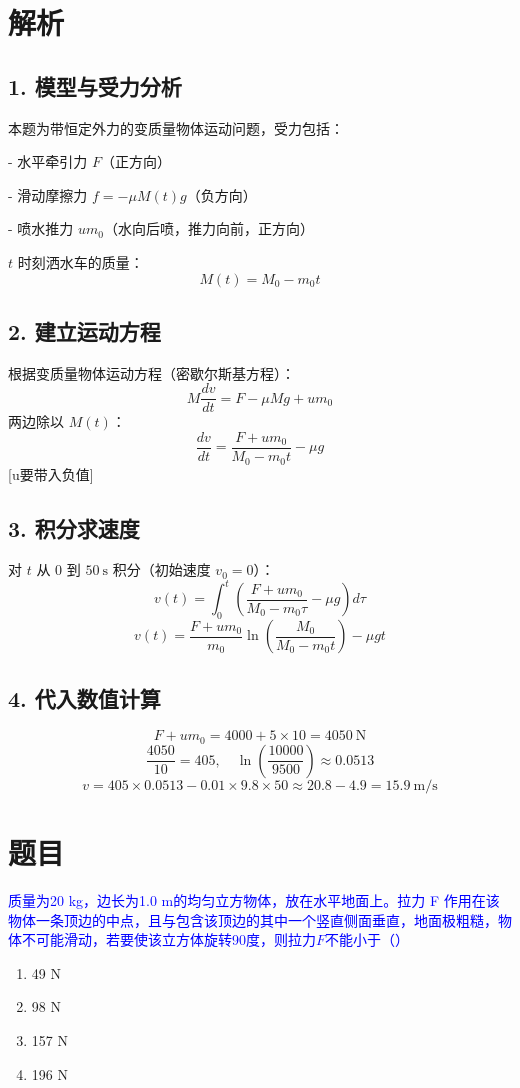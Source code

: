 \documentclass[11pt,a4paper]{article}
\begin{document}
\section*{解析}

\subsection*{1. 模型与受力分析}
本题为带恒定外力的变质量物体运动问题，受力包括：

- 水平牵引力 $F$（正方向）

- 滑动摩擦力 $f = -\mu M(t)g$（负方向）

- 喷水推力 $u m_0$（水向后喷，推力向前，正方向）

\noindent $t$ 时刻洒水车的质量：
\[
M(t) = M_0 - m_0 t
\]

\subsection*{2. 建立运动方程}
根据变质量物体运动方程（密歇尔斯基方程）：
\[
M \frac{dv}{dt} = F - \mu M g + u m_0
\]
两边除以 $M(t)$：
\[
\frac{dv}{dt} = \frac{F + u m_0}{M_0 - m_0 t} - \mu g
\]
[u要带入负值]
\subsection*{3. 积分求速度}
对 $t$ 从 $0$ 到 $50\ \text{s}$ 积分（初始速度 $v_0=0$）：
\[
v(t) = \int_0^t \left( \frac{F + u m_0}{M_0 - m_0 \tau} - \mu g \right) d\tau
\]
\[
v(t) = \frac{F + u m_0}{m_0} \ln\left( \frac{M_0}{M_0 - m_0 t} \right) - \mu g t
\]

\subsection*{4. 代入数值计算}
\[
F + u m_0 = 4000 + 5 \times 10 = 4050\ \text{N}
\]
\[
\frac{4050}{10} = 405, \quad \ln\left(\frac{10000}{9500}\right) \approx 0.0513
\]
\[
v = 405 \times 0.0513 - 0.01 \times 9.8 \times 50 \approx 20.8 - 4.9 = 15.9\ \text{m/s}
\]

\section*{题目}
\textcolor{blue}{质量为20 kg，边长为1.0 m的均匀立方物体，放在水平地面上。拉力 F 作用在该物体一条顶边的中点，且与包含该顶边的其中一个竖直侧面垂直，地面极粗糙，物体不可能滑动，若要使该立方体旋转90度，则拉力$F$不能小于（）}

\begin{enumerate}
    \item[A] 49 N
    \item[B] 98 N
    \item[C] 157 N
    \item[D] 196 N
\end{enumerate}
\end{document}
